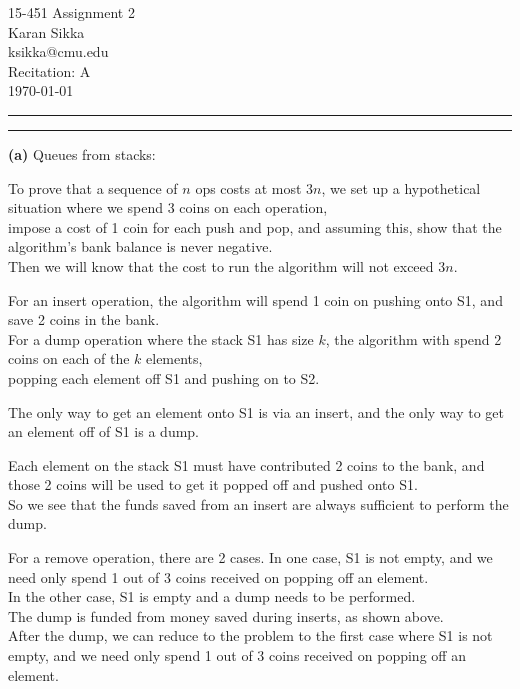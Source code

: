 \documentclass[11pt]{article}
\makeatletter
\newcommand{\question}[2] {\vspace{.25in} \hrule\vspace{0.5em}
\noindent{\bf #1: #2} \vspace{0.5em}
\hrule \vspace{.10in}}
\renewcommand{\part}[1] {\vspace{.10in} {\bf (#1)}}
\newcommand{\myname}{Karan Sikka}
\newcommand{\myandrew}{ksikka@cmu.edu}
\newcommand{\myhwnum}{2}
\makeatother
\begin{document}
\medskip

\thispagestyle{plain}
\begin{center}
{\Large 15-451 Assignment \myhwnum} \\
\myname \\
\myandrew \\
Recitation: A \\
\today \\
\end{center}

\question{1}{Max Stacks and Quacks}

\part{a} Queues from stacks:

To prove that a sequence of $n$ ops costs at most $3n$, we set up a hypothetical situation where we spend 3 coins on each operation,\\
impose a cost of 1 coin for each push and pop, and assuming this, show that the algorithm's bank balance is never negative.\\
Then we will know that the cost to run the algorithm will not exceed $3n$.

For an insert operation, the algorithm will spend 1 coin on pushing onto S1, and save 2 coins in the bank.\\

For a dump operation where the stack S1 has size $k$, the algorithm with spend 2 coins on each of the $k$ elements,\\
popping each element off S1 and pushing on to S2.

The only way to get an element onto S1 is via an insert, and the only way to get an element off of S1 is a dump.

Each element on the stack S1 must have contributed 2 coins to the bank, and those 2 coins will be used to get it popped off and pushed onto S1.\\
So we see that the funds saved from an insert are always sufficient to perform the dump.

For a remove operation, there are 2 cases. In one case, S1 is not empty, and we need only spend 1 out of 3 coins received on popping off an element.\\
In the other case, S1 is empty and a dump needs to be performed.\\
The dump is funded from money saved during inserts, as shown above.\\
After the dump, we can reduce to the problem to the first case where S1 is not empty, and we need only spend 1 out of 3 coins received on popping off an element.
\end{document}
